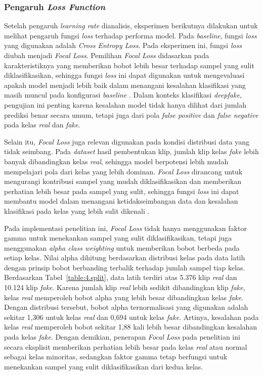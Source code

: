 \subsubsection{Pengaruh \textit{Loss Function}} \label{IV.Eksperimen_Ablation_Loss}
Setelah pengaruh \textit{learning rate} dianalisis, eksperimen berikutnya dilakukan untuk melihat pengaruh fungsi \textit{loss} terhadap performa model. Pada \textit{baseline}, fungsi \textit{loss} yang digunakan adalah \textit{Cross Entropy Loss}. Pada eksperimen ini, fungsi \textit{loss} diubah menjadi \textit{Focal Loss}. Pemilihan \textit{Focal Loss} didasarkan pada karakteristiknya yang memberikan bobot lebih besar terhadap sampel yang sulit diklasifikasikan, sehingga fungsi \textit{loss} ini dapat digunakan untuk mengevaluasi apakah model menjadi lebih baik dalam menangani kesalahan klasifikasi yang masih muncul pada konfigurasi \textit{baseline} \cite{lin2018focallossdenseobject}. Dalam konteks klasifikasi \textit{deepfake}, pengujian ini penting karena kesalahan model tidak hanya dilihat dari jumlah prediksi benar secara umum, tetapi juga dari pola \textit{false positive} dan \textit{false negative} pada kelas \textit{real} dan \textit{fake}.

Selain itu, \textit{Focal Loss} juga relevan digunakan pada kondisi distribusi data yang tidak seimbang. Pada \textit{dataset} hasil pembentukan klip, jumlah klip kelas \textit{fake} lebih banyak dibandingkan kelas \textit{real}, sehingga model berpotensi lebih mudah mempelajari pola dari kelas yang lebih dominan. \textit{Focal Loss} dirancang untuk mengurangi kontribusi sampel yang mudah diklasifikasikan dan memberikan perhatian lebih besar pada sampel yang sulit, sehingga fungsi \textit{loss} ini dapat membantu model dalam menangani ketidakseimbangan data dan kesalahan klasifikasi pada kelas yang lebih sulit dikenali \cite{lin2018focallossdenseobject}.

Pada implementasi penelitian ini, \textit{Focal Loss} tidak hanya menggunakan faktor gamma untuk menekankan sampel yang sulit diklasifikasikan, tetapi juga menggunakan \textit{alpha class weighting} untuk memberikan bobot berbeda pada setiap kelas. Nilai alpha dihitung berdasarkan distribusi kelas pada data latih dengan prinsip bobot berbanding terbalik terhadap jumlah sampel tiap kelas. Berdasarkan Tabel~\ref{table:4.split}, data latih terdiri atas 5.376 klip \textit{real} dan 10.124 klip \textit{fake}. Karena jumlah klip \textit{real} lebih sedikit dibandingkan klip \textit{fake}, kelas \textit{real} memperoleh bobot alpha yang lebih besar dibandingkan kelas \textit{fake}. Dengan distribusi tersebut, bobot alpha ternormalisasi yang digunakan adalah sekitar 1,306 untuk kelas \textit{real} dan 0,694 untuk kelas \textit{fake}. Artinya, kesalahan pada kelas \textit{real} memperoleh bobot sekitar 1,88 kali lebih besar dibandingkan kesalahan pada kelas \textit{fake}. Dengan demikian, penerapan \textit{Focal Loss} pada penelitian ini secara eksplisit memberikan perhatian lebih besar pada kelas \textit{real} atau normal sebagai kelas minoritas, sedangkan faktor gamma tetap berfungsi untuk menekankan sampel yang sulit diklasifikasikan dari kedua kelas.

